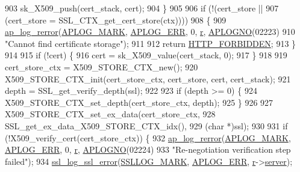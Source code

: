 \begin{DoxyCode}
{{903                 sk\_X509\_push(cert\_stack, cert);
904             \}
905 
906             \textcolor{keywordflow}{if} (!(cert\_store ||
907                   (cert\_store = SSL\_CTX\_get\_cert\_store(ctx))))
908             \{
909                 \hyperlink{group__APACHE__CORE__LOG_ga4c112558ccffd6b363da102b2052d2a6}{ap\_log\_rerror}(\hyperlink{group__APACHE__CORE__LOG_ga655e126996849bcb82e4e5a14c616f4a}{APLOG\_MARK}, \hyperlink{group__APACHE__CORE__LOG_ga57ad94ed8c92c4306de90479251a5d58}{APLOG\_ERR}, 0, 
      \hyperlink{group__APACHE__CORE__CONFIG_ga091cdd45984e865a888a4f8bb8fe107a}{r}, \hyperlink{group__APACHE__CORE__LOG_ga1dee8a07e06bc5b3de8b89662c2cd666}{APLOGNO}(02223)
910                               \textcolor{stringliteral}{"Cannot find certificate storage"});
911 
912                 \textcolor{keywordflow}{return} \hyperlink{group__HTTP__Status_ga92646f876056a1e5013e0050496dc04d}{HTTP\_FORBIDDEN};
913             \}
914 
915             \textcolor{keywordflow}{if} (!cert) \{
916                 cert = sk\_X509\_value(cert\_stack, 0);
917             \}
918 
919             cert\_store\_ctx = X509\_STORE\_CTX\_new();
920             X509\_STORE\_CTX\_init(cert\_store\_ctx, cert\_store, cert, cert\_stack);
921             depth = SSL\_get\_verify\_depth(ssl);
922 
923             \textcolor{keywordflow}{if} (depth >= 0) \{
924                 X509\_STORE\_CTX\_set\_depth(cert\_store\_ctx, depth);
925             \}
926 
927             X509\_STORE\_CTX\_set\_ex\_data(cert\_store\_ctx,
928                                        SSL\_get\_ex\_data\_X509\_STORE\_CTX\_idx(),
929                                        (\textcolor{keywordtype}{char} *)ssl);
930 
931             \textcolor{keywordflow}{if} (!X509\_verify\_cert(cert\_store\_ctx)) \{
932                 \hyperlink{group__APACHE__CORE__LOG_ga4c112558ccffd6b363da102b2052d2a6}{ap\_log\_rerror}(\hyperlink{group__APACHE__CORE__LOG_ga655e126996849bcb82e4e5a14c616f4a}{APLOG\_MARK}, \hyperlink{group__APACHE__CORE__LOG_ga57ad94ed8c92c4306de90479251a5d58}{APLOG\_ERR}, 0, 
      \hyperlink{group__APACHE__CORE__CONFIG_ga091cdd45984e865a888a4f8bb8fe107a}{r}, \hyperlink{group__APACHE__CORE__LOG_ga1dee8a07e06bc5b3de8b89662c2cd666}{APLOGNO}(02224)
933                               \textcolor{stringliteral}{"Re-negotiation verification step failed"});
934                 \hyperlink{group__MOD__SSL__PRIVATE_ga9a4071d17f72df0574d3c8840886d3bb}{ssl\_log\_ssl\_error}(\hyperlink{group__MOD__SSL__PRIVATE_ga0e50481cba5952ce59ad2c103f8128a4}{SSLLOG\_MARK}, 
      \hyperlink{group__APACHE__CORE__LOG_ga57ad94ed8c92c4306de90479251a5d58}{APLOG\_ERR}, \hyperlink{group__APACHE__CORE__CONFIG_ga091cdd45984e865a888a4f8bb8fe107a}{r}->\hyperlink{structrequest__rec_a4a8059930ce9409cb885fdeef6921b7b}{server});
}}
\end{DoxyCode}
